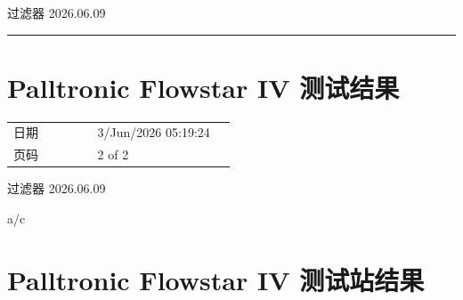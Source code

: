 \documentclass[UTF8,10pt,a4paper,fontset=fandol]{ctexart}
\newcommand{\fieldvalue}[1]{#1}
\newcommand{\handwritten}[1]{#1}
\begin{document}
\handwritten{过滤器 2026.06.09}

\bigskip
\hrule
\bigskip

\section*{Palltronic Flowstar IV 测试结果}

\begin{tabular}{@{}p{0.34\linewidth}p{0.56\linewidth}@{}}
日期 &
\fieldvalue{3/Jun/2026 05:19:24}
\\[2pt]
页码 &
\fieldvalue{2 of 2}
\end{tabular}

\bigskip

\begin{center}
\end{center}

\handwritten{过滤器 2026.06.09}

\handwritten{a/c}

\newpage

\section{Palltronic Flowstar IV 测试站结果}
\end{document}
